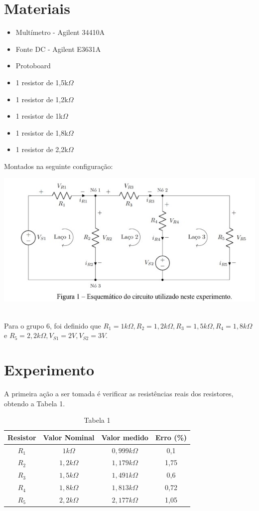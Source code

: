 \documentclass[a4 paper]{article}
\newcommand{\parag}{\hspace{30pt}}
\begin{document}
\section{Materiais}
\begin{itemize}
\item Multímetro - Agilent 34410A
\item Fonte DC - Agilent E3631A
\item Protoboard
\item 1 resistor de 1,5k$\Omega$
\item 1 resistor de 1,2k$\Omega$
\item 1 resistor de 1k$\Omega$
\item 1 resistor de 1,8k$\Omega$
\item 1 resistor de 2,2k$\Omega$
\end{itemize}
Montados na seguinte configuração:
\begin{table}[h]
\centering
\includegraphics[scale=0.6]{figuras/figura2}
\end{table}
\\\parag Para o grupo 6, foi definido que $R_1=1k\Omega, R_2=1,2k\Omega, R_3=1,5k\Omega, R_4=1,8k\Omega$ e $R_5=2,2k\Omega, V_{S1}=2V, V_{S2}=3V$.


\newpage\section{Experimento}
\parag A primeira ação a ser tomada é verificar as resistências reais dos resistores, obtendo a Tabela 1.\\

\vspace{5pt}
\begin{table}[h]
\centering
\begin{tabular}{|c|c|c|c|}
\hline
Resistor & Valor Nominal & Valor medido & Erro (\%)\\ \hline
$R_1$ & $1k\Omega$ & $0,999k\Omega$ & 0,1  \\\hline
$R_2$ & $1,2k\Omega$ & $1,179k\Omega$ & 1,75 \\\hline
$R_3$ & $1,5k\Omega$ & $1,491k\Omega$ & 0,6 \\\hline
$R_4$ & $1,8k\Omega$ & $1,813k\Omega$ & 0,72 \\\hline
$R_5$ & $2,2k\Omega$ & $2,177k\Omega$ & 1,05 \\\hline
\end{tabular}
\caption*{Tabela 1}
\end{table}
\end{document}
